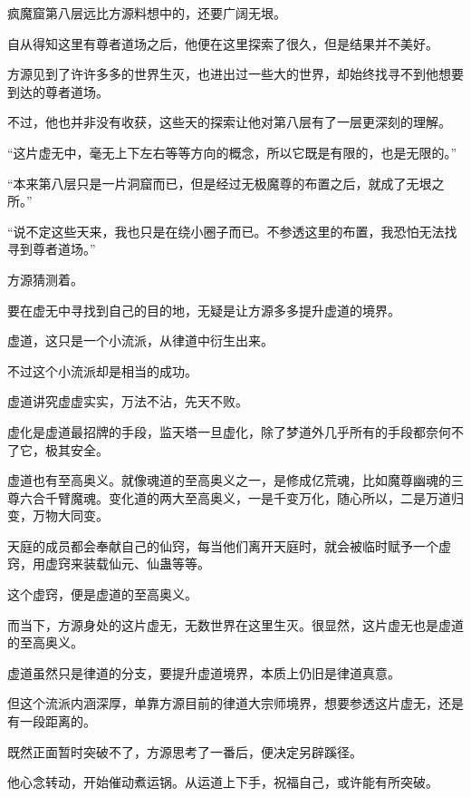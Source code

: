 
\begin{this_body}



疯魔窟第八层远比方源料想中的，还要广阔无垠。

自从得知这里有尊者道场之后，他便在这里探索了很久，但是结果并不美好。

方源见到了许许多多的世界生灭，也进出过一些大的世界，却始终找寻不到他想要到达的尊者道场。

不过，他也并非没有收获，这些天的探索让他对第八层有了一层更深刻的理解。

“这片虚无中，毫无上下左右等等方向的概念，所以它既是有限的，也是无限的。”

“本来第八层只是一片洞窟而已，但是经过无极魔尊的布置之后，就成了无垠之所。”

“说不定这些天来，我也只是在绕小圈子而已。不参透这里的布置，我恐怕无法找寻到尊者道场。”

方源猜测着。

要在虚无中寻找到自己的目的地，无疑是让方源多多提升虚道的境界。

虚道，这只是一个小流派，从律道中衍生出来。

不过这个小流派却是相当的成功。

虚道讲究虚虚实实，万法不沾，先天不败。

虚化是虚道最招牌的手段，监天塔一旦虚化，除了梦道外几乎所有的手段都奈何不了它，极其安全。

虚道也有至高奥义。就像魂道的至高奥义之一，是修成亿荒魂，比如魔尊幽魂的三尊六合千臂魔魂。变化道的两大至高奥义，一是千变万化，随心所以，二是万道归变，万物大同变。

天庭的成员都会奉献自己的仙窍，每当他们离开天庭时，就会被临时赋予一个虚窍，用虚窍来装载仙元、仙蛊等等。

这个虚窍，便是虚道的至高奥义。

而当下，方源身处的这片虚无，无数世界在这里生灭。很显然，这片虚无也是虚道的至高奥义。

虚道虽然只是律道的分支，要提升虚道境界，本质上仍旧是律道真意。

但这个流派内涵深厚，单靠方源目前的律道大宗师境界，想要参透这片虚无，还是有一段距离的。

既然正面暂时突破不了，方源思考了一番后，便决定另辟蹊径。

他心念转动，开始催动煮运锅。从运道上下手，祝福自己，或许能有所突破。


\end{this_body}
